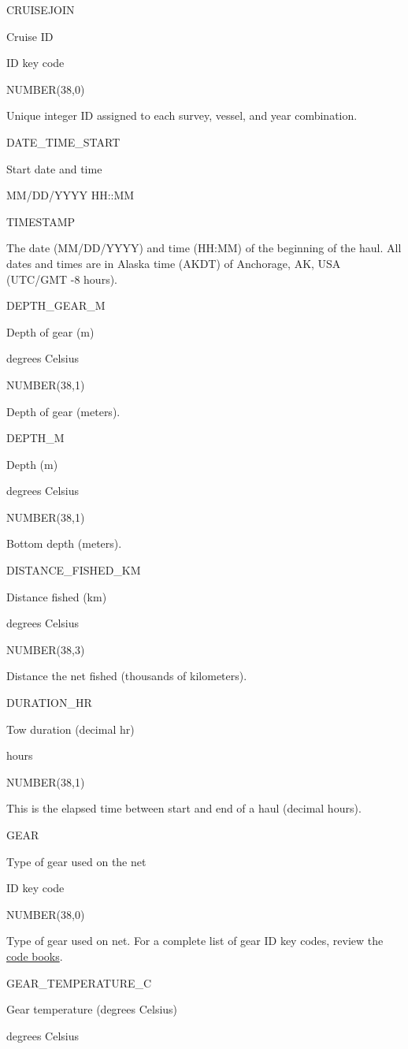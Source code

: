 \documentclass[
  letterpaper,
  oneside,
  open=any]{scrbook}
\begin{document}
CRUISEJOIN

Cruise ID

ID key code

NUMBER(38,0)

Unique integer ID assigned to each survey, vessel, and year combination.

DATE\_TIME\_START

Start date and time

MM/DD/YYYY HH::MM

TIMESTAMP

The date (MM/DD/YYYY) and time (HH:MM) of the beginning of the haul. All
dates and times are in Alaska time (AKDT) of Anchorage, AK, USA (UTC/GMT
-8 hours).

DEPTH\_GEAR\_M

Depth of gear (m)

degrees Celsius

NUMBER(38,1)

Depth of gear (meters).

DEPTH\_M

Depth (m)

degrees Celsius

NUMBER(38,1)

Bottom depth (meters).

DISTANCE\_FISHED\_KM

Distance fished (km)

degrees Celsius

NUMBER(38,3)

Distance the net fished (thousands of kilometers).

DURATION\_HR

Tow duration (decimal hr)

hours

NUMBER(38,1)

This is the elapsed time between start and end of a haul (decimal
hours).

GEAR

Type of gear used on the net

ID key code

NUMBER(38,0)

Type of gear used on net. For a complete list of gear ID key codes,
review the
\href{https://www.fisheries.noaa.gov/resource/document/groundfish-survey-species-code-manual-and-data-codes-manual}{code
books}.

GEAR\_TEMPERATURE\_C

Gear temperature (degrees Celsius)

degrees Celsius
\end{document}
